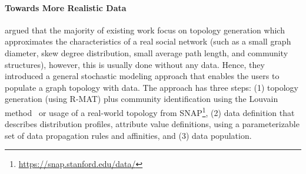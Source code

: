 \paragraph{Towards More Realistic Data} \cite{Nettleton2016} argued that the majority of existing work focus on 
topology generation which approximates the characteristics of a real social
network (such as a small graph diameter, skew degree
distribution, small average path length, and community structures), however,  this is usually done without any data. Hence, they
introduced a general stochastic modeling approach that enables the users to
populate a graph topology with data. The approach has three steps: (1) topology
generation (using R-MAT) plus community identification using the Louvain
method~\cite{1742-5468-2008-10-P10008} or usage of a real-world topology from
SNAP\footnote{\url{https://snap.stanford.edu/data/}}, (2) data definition
that describes distribution profiles, attribute value definitions, using a
parameterizable set of data propagation rules and affinities, and (3) data
population.


